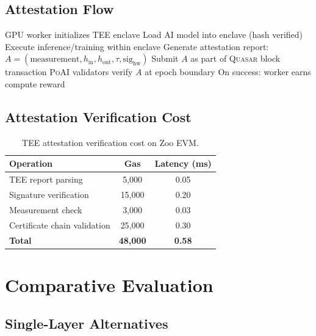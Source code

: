 \documentclass[11pt,letterpaper]{article}
\newcommand{\PoAI}{\textsc{PoAI}}
\newcommand{\Quasar}{\textsc{Quasar}}
\begin{document}
\subsection{Attestation Flow}

\begin{algorithm}[t]
\caption{GPU TEE Attestation on Zoo}
\label{alg:tee}
\begin{algorithmic}[1]
\STATE GPU worker initializes TEE enclave
\STATE Load AI model into enclave (hash verified)
\STATE Execute inference/training within enclave
\STATE Generate attestation report:
\STATE \quad $A = (\text{measurement}, h_{\text{in}}, h_{\text{out}}, \tau, \text{sig}_{\text{hw}})$
\STATE Submit $A$ as part of \Quasar{} block transaction
\STATE \PoAI{} validators verify $A$ at epoch boundary
\STATE On success: worker earns compute reward
\end{algorithmic}
\end{algorithm}

\subsection{Attestation Verification Cost}

\begin{table}[t]
\centering
\begin{tabular}{lcc}
\toprule
\textbf{Operation} & \textbf{Gas} & \textbf{Latency (ms)} \\
\midrule
TEE report parsing & 5,000 & 0.05 \\
Signature verification & 15,000 & 0.20 \\
Measurement check & 3,000 & 0.03 \\
Certificate chain validation & 25,000 & 0.30 \\
\midrule
\textbf{Total} & \textbf{48,000} & \textbf{0.58} \\
\bottomrule
\end{tabular}
\caption{TEE attestation verification cost on Zoo EVM.}
\label{tab:attest-cost}
\end{table}

\section{Comparative Evaluation}
\label{sec:comparison}

\subsection{Single-Layer Alternatives}
\end{document}
